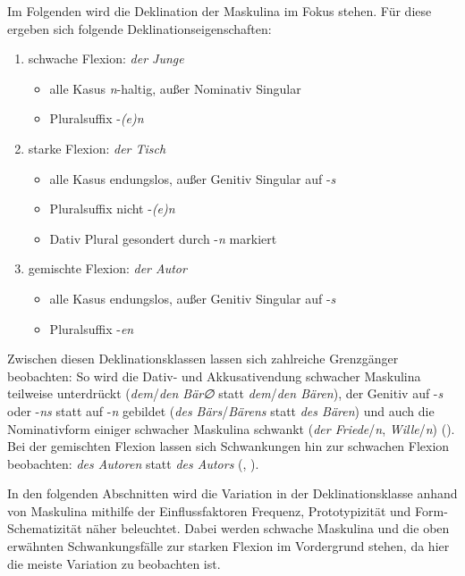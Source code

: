  
Im Folgenden wird die Deklination der Maskulina im Fokus stehen. Für diese ergeben sich folgende Deklinationseigenschaften:

\begin{enumerate}
\item schwache Flexion: \textit{der Junge}
  \begin{itemize}
   \item  alle Kasus \textit{n}-haltig, außer Nominativ Singular
   \item  Pluralsuffix -\textit{(e)n}
  \end{itemize}
\item starke Flexion: \textit{der Tisch}
  \begin{itemize}
    \item alle Kasus endungslos, außer Genitiv Singular auf -\textit{s}
    \item Pluralsuffix nicht -\textit{(e)n}
    \item Dativ Plural gesondert durch -\textit{n} markiert
  \end{itemize}
\item gemischte Flexion: \textit{der Autor}
  \begin{itemize}
    \item alle Kasus endungslos, außer Genitiv Singular auf -\textit{s}
    \item Pluralsuffix -\textit{en}
  \end{itemize}
\end{enumerate}

Zwischen diesen Deklinationsklassen lassen sich zahlreiche Grenzgänger beobachten: So wird die Dativ- und Akkusativendung schwacher Maskulina teilweise unterdrückt (\textit{dem}/\textit{den Bär∅} statt \textit{dem}/\textit{den Bären}), der Genitiv auf -\textit{s} oder -\textit{ns} statt auf -\textit{n} gebildet (\textit{des Bärs}/\textit{Bärens} statt \textit{des Bären}) und auch die Nominativform einiger schwacher Maskulina schwankt (\textit{der Friede}/\textit{n}, \textit{Wille}/\textit{n}) (\cite[153--154]{Eisenberg.2013}). Bei der gemischten Flexion lassen sich Schwankungen hin zur schwachen Flexion beobachten: \textit{des Autoren} statt \textit{des Autors} (\cite[105--106]{Thieroff.2003}, \cite[78]{Kopcke.2005}). 

In den folgenden Abschnitten wird die Variation in der Deklinationsklasse anhand von Maskulina mithilfe der Einflussfaktoren Frequenz, Prototypizität und Form-Schematizität näher beleuchtet. Dabei werden schwache Maskulina und die oben erwähnten Schwankungsfälle zur starken Flexion im Vordergrund stehen, da hier die meiste Variation zu beobachten ist. 

